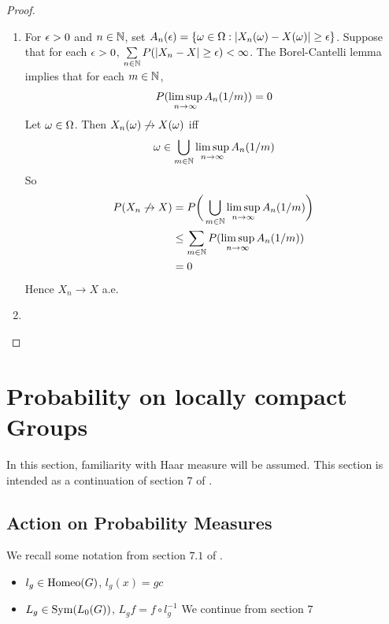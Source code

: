 \documentclass{book}
\begin{document}
	\begin{proof}\
		\begin{enumerate}
			\item For $\epsilon>0$ and $n \in \mathbb{N}$, set $A_n(\epsilon) = \{\omega \in \Omega: |X_n(\omega) - X(\omega)| \geq \epsilon\}$. Suppose that for each $\epsilon >0 $, $\sum\limits_{n \in \mathbb{N}} P(|X_n - X| \geq \epsilon) < \infty$.  The Borel-Cantelli lemma implies that for each $m \in \mathbb{N}$,  $$P(\limsup \limits_{n \rightarrow \infty} A_n(1/m)) = 0$$
			 Let $\omega \in \Omega$. Then $X_n(\omega) \not \rightarrow X(\omega)$ iff $$\omega \in \bigcup_{m \in \mathbb{N}} \limsup \limits_{n \rightarrow \infty} A_n(1/m)$$ 
		So 
		\begin{align*}
		P(X_n \not \rightarrow X)
		&= P\bigg( \bigcup_{m \in \mathbb{N}} \limsup \limits_{n \rightarrow \infty} A_n(1/m) \bigg) \\
		&\leq \sum_{m \in \mathbb{N}}P(\limsup \limits_{n \rightarrow \infty} A_n(1/m)) \\
		&= 0
\end{align*}		 
	Hence $X_n \rightarrow X$ a.e.
	\item 
		\end{enumerate}
	\end{proof}
	
	
	
	
	
	
	
	
	
	








	\newpage	
	\chapter{Probability on locally compact Groups}
	
	\begin{note}
	In this section, familiarity with Haar measure will be assumed. This section is intended as a continuation of section $7$ of \cite{measure}.
	\end{note}
	
	
	\section{Action on Probability Measures}
	
	\begin{note}
	We recall some notation from section $7.1$ of \cite{measure}.
	\begin{itemize}
	\item $l_g \in \operatorname{\text{Homeo}}(G)$, $l_g(x) = gc$
	\item $L_g \in \operatorname{Sym}(L_0(G))$, $L_g f = f \circ l_g^{-1}$
	We continue from section $7$
	\end{itemize}
	\end{note}
	
\end{document}
